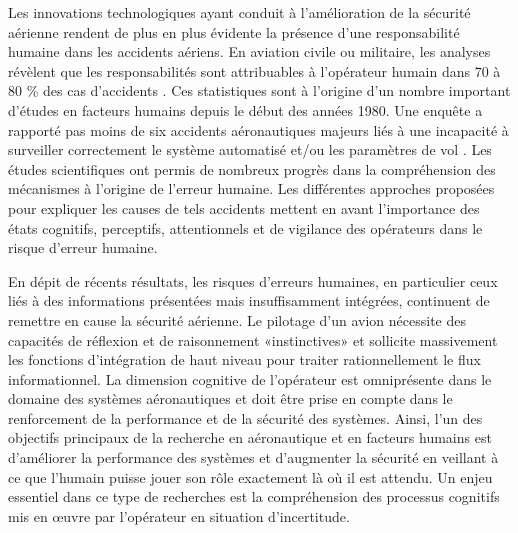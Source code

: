 Les innovations technologiques ayant conduit à l’amélioration de la sécurité aérienne rendent de plus en plus évidente la présence d’une responsabilité humaine dans les accidents aériens. 
En aviation civile ou militaire, les analyses révèlent que les responsabilités sont attribuables à l’opérateur humain dans 70 à 80 \% des cas d’accidents \citep{o1994cognitive, shappell2003reshaping}. 
Ces statistiques sont à l'origine d'un nombre important d’études en facteurs humains depuis le début des années 1980. 
Une enquête a rapporté pas moins de six accidents aéronautiques majeurs liés à une incapacité à surveiller correctement le système automatisé et/ou les paramètres de vol \citep{billings1991human}. 
Les études scientifiques ont permis de nombreux progrès dans la compréhension des mécanismes à l’origine de l’erreur humaine. 
Les différentes approches proposées pour expliquer les causes de tels accidents mettent en avant l’importance des états cognitifs, perceptifs, attentionnels et de vigilance des opérateurs dans le risque d’erreur humaine. 

En dépit de récents résultats, les risques d’erreurs humaines, en particulier ceux liés à des informations présentées mais insuffisamment intégrées, continuent de remettre en cause la sécurité aérienne. 
Le pilotage d’un avion nécessite des capacités de réflexion et de raisonnement «instinctives» et sollicite massivement les fonctions d’intégration de haut niveau pour traiter rationnellement le flux informationnel. 
La dimension cognitive de l’opérateur est omniprésente dans le domaine des systèmes aéronautiques et doit être prise en compte dans le renforcement de la performance et de la sécurité des systèmes. 
Ainsi, l'un des objectifs principaux de la recherche en aéronautique et en facteurs humains est d'améliorer la performance des systèmes et d'augmenter la sécurité en veillant à ce que l'humain puisse jouer son rôle exactement là où il est attendu. 
Un enjeu essentiel dans ce type de recherches est la compréhension des processus cognitifs mis en œuvre par l’opérateur en situation d'incertitude.

